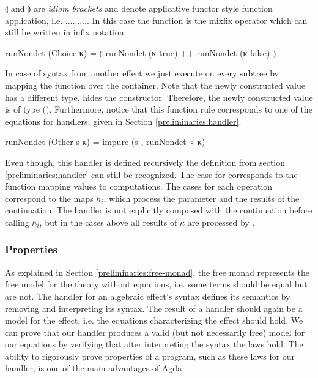 \begin{AgdaAlign}
  $\llparenthesis$ and $\rrparenthesis$ are \textit{idiom brackets} and denote
  applicative functor style function application, i.e.
  \AgdaSpace{}\AgdaSpace{}\AgdaFunction{<*>}$\dots$\AgdaFunction{<*>}$\dots$\AgdaFunction{<*>}$\dots$.
  In this case the function  is the mixfix operator
  \AgdaFunction{++} which can still be written in infix notation.
  \begin{code}
runNondet (Choice κ)   = ⦇ runNondet (κ true) ++ runNondet (κ false) ⦈
  \end{code}
  In case of syntax from another effect we just execute 
  on every subtree by mapping the function over the container.
  Note that the newly constructed value has a different type.
   hides the 
  constructor.
  Therefore, the newly constructed  value is of
  type
  \AgdaSpace{}\AgdaSpace{}$($\AgdaSpace{}$)$.
  Furthermore, notice that this function rule corresponds to one of the equations
  for handlers, given in Section \ref{preliminaries:handler}.
  \begin{code}
runNondet (Other s κ)  = impure (s , runNondet ∘ κ)
  \end{code}
  Even though, this handler is defined recursively the definition from section
  \ref{preliminaries:handler} can still be recognized.
  The case for  corresponds to the function
  mapping values to computations.
  The cases for each operation correspond to the maps $h_i$, which process the
  parameter and the results of the continuation.
  The handler is not explicitly composed with the continuation before calling
  $h_i$, but in the cases above all results of $\kappa$ are processed by
  .
\end{AgdaAlign}


\subsubsection{Properties}
\label{first-order:nondet:properties}

As explained in Section \ref{preliminaries:free-monad}, the free monad
represents the free model for the theory without equations, i.e. some terms
should be equal but are not.
The handler for an algebraic effect's syntax defines its semantics by removing
and interpreting its syntax.
The result of a handler should again be a model for the effect, i.e. the
equations characterizing the effect should hold.
We can prove that our handler produces a valid (but not necessarily free) model
for our equations by verifying that after interpreting the syntax the laws hold.
The ability to rigorously prove properties of a program, such as these laws for
our handler, is one of the main advantages of Agda.

